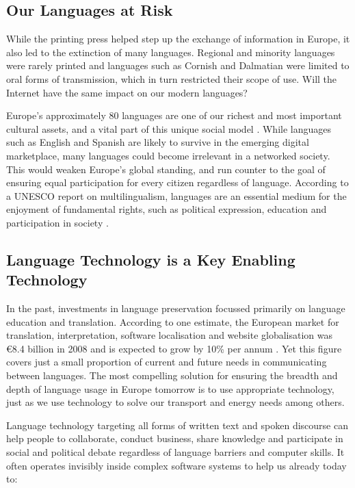 \begin{multicols}{2}
\subsection{Our Languages at Risk}

While the printing press helped step up the exchange of information in Europe, it also led to the extinction of many languages. Regional and minority languages were rarely printed and languages such as Cornish and Dalmatian were limited to oral forms of transmission, which in turn restricted their scope of use. Will the Internet have the same impact on our modern languages?


Europe’s approximately 80 languages are one of our richest and most important cultural assets, and a vital part of this unique social model \cite{EC2}. While languages such as English and Spanish are likely to survive in the emerging digital marketplace, many languages could become irrelevant in a networked society. This would weaken Europe’s global standing, and run counter to the goal of ensuring equal participation for every citizen regardless of language. According to a UNESCO report on multilingualism, languages are an essential medium for the enjoyment of fundamental rights, such as political expression, education and participation in society \cite{Unesco1}.

\subsection{Language Technology is a Key Enabling Technology}

In the past, investments in language preservation focussed primarily on language education and translation. According to one estimate, the European market for translation, interpretation, software localisation and website globalisation was €8.4 billion in 2008 and is expected to grow by 10\% per annum \cite{EC3}. Yet this figure covers just a small proportion of current and future needs in communicating between languages. The most compelling solution for ensuring the breadth and depth of language usage in Europe tomorrow is to use appropriate technology, just as we use technology to solve our transport and energy needs among others.

Language technology targeting all forms of written text and spoken discourse can help people to collaborate, conduct business, share knowledge and participate in social and political debate regardless of language barriers and computer skills. It often operates invisibly inside complex software systems to help us already today to:


\end{multicols}
